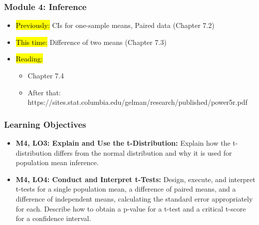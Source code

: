 
\begin{frame}
    \frametitle{Module 4: Inference}
    \begin{itemize}
        \item \hl{Previously: }CIs for one-sample means, Paired data (Chapter 7.2)
        \item \hl{This time: }Difference of two means (Chapter 7.3)
        \item \hl{Reading: }
        \begin{itemize}
            \item Chapter 7.4
            \item After that: https://sites.stat.columbia.edu/gelman/research/published/power5r.pdf
        \end{itemize}
    \end{itemize}

\end{frame}
\begin{frame}
    \frametitle{Learning Objectives}
    \begin{itemize}
        \item \textbf{M4, LO3: Explain and Use the t-Distribution:} Explain how the t-distribution differs from the normal distribution and why it is used for population mean inference.
        \item \textbf{M4, LO4: Conduct and Interpret t-Tests:} Design, execute, and interpret t-tests for a single population mean, a difference of paired means, and a difference of independent means, calculating the standard error appropriately for each. Describe how to obtain a p-value for a t-test and a critical t-score for a confidence interval.
    \end{itemize}
\end{frame}
